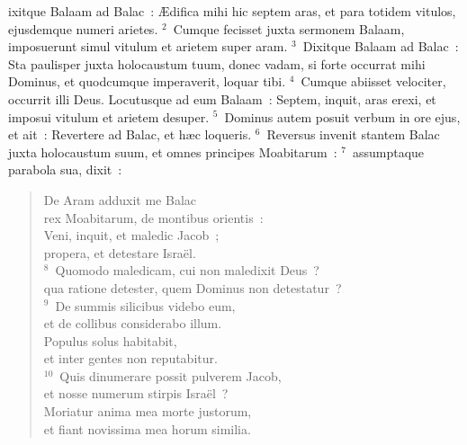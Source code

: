 \bchapter
{}ixitque Balaam ad Balac~: \AE difica mihi hic septem aras, et para totidem vitulos, ejusdemque numeri arietes.
${}^{2}$~Cumque fecisset juxta sermonem Balaam, imposuerunt simul vitulum et arietem super aram.
${}^{3}$~Dixitque Balaam ad Balac~: Sta paulisper juxta holocaustum tuum, donec vadam, si forte occurrat mihi Dominus, et quodcumque imperaverit, loquar tibi.
${}^{4}$~Cumque abiisset velociter, occurrit illi Deus. Locutusque ad eum Balaam~: Septem, inquit, aras erexi, et imposui vitulum et arietem desuper.
${}^{5}$~Dominus autem posuit verbum in ore ejus, et ait~: Revertere ad Balac, et h\ae c loqueris.
${}^{6}$~Reversus invenit stantem Balac juxta holocaustum suum, et omnes principes Moabitarum~:
${}^{7}$~assumptaque parabola sua, dixit~: \begin{flushleft}\begin{verse}De Aram adduxit me Balac\\ rex Moabitarum, de montibus orientis~:\\ Veni, inquit, et maledic Jacob~;\\ propera, et detestare Isra\"el.\\
${}^{8}$~Quomodo maledicam, cui non maledixit Deus~?\\ qua ratione detester, quem Dominus non detestatur~?\\
${}^{9}$~De summis silicibus videbo eum,\\ et de collibus considerabo illum.\\ Populus solus habitabit,\\ et inter gentes non reputabitur.\\
${}^{10}$~Quis dinumerare possit pulverem Jacob,\\ et nosse numerum stirpis Isra\"el~?\\ Moriatur anima mea morte justorum,\\ et fiant novissima mea horum similia.\end{verse}\end{flushleft}


